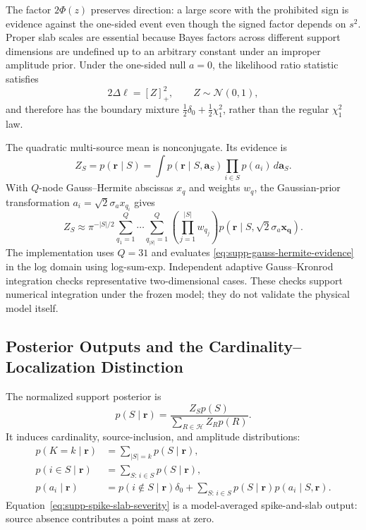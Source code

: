 The factor $2\Phi(z)$ preserves direction: a large score with the prohibited
sign is evidence against the one-sided event even though the signed factor
depends on $s^2$. Proper slab scales are essential because Bayes factors across
different support dimensions are undefined up to an arbitrary constant under
an improper amplitude prior. Under the one-sided null $a=0$, the likelihood
ratio statistic satisfies
\begin{equation}
 2\Delta\ell=[Z]_+^2,\qquad Z\sim\mathcal N(0,1),
 \label{eq:supp-boundary-lrt}
\end{equation}
and therefore has the boundary mixture
$\tfrac12\delta_0+\tfrac12\chi_1^2$, rather than the regular $\chi_1^2$ law.

The quadratic multi-source mean is nonconjugate. Its evidence is
\begin{equation}
 Z_S=p(\bm r\mid S)=
 \int p(\bm r\mid S,\bm a_S)
 \prod_{i\in S}p(a_i)\,d\bm a_S.
 \label{eq:supp-support-evidence}
\end{equation}
With $Q$-node Gauss--Hermite abscissas $x_q$ and weights $w_q$, the Gaussian-prior transformation $a_i=\sqrt2\sigma_ax_{q_i}$ gives
\begin{equation}
 Z_S\approx\pi^{-|S|/2}
 \sum_{q_1=1}^{Q}\cdots\sum_{q_{|S|}=1}^{Q}
 \left(\prod_{j=1}^{|S|}w_{q_j}\right)
 p(\bm r\mid S,\sqrt2\sigma_a\bm x_{\bm q}).
 \label{eq:supp-gauss-hermite-evidence}
\end{equation}
The implementation uses $Q=31$ and evaluates \eqref{eq:supp-gauss-hermite-evidence} in the log domain using log-sum-exp. Independent adaptive Gauss--Kronrod integration checks representative two-dimensional cases. These checks support numerical integration under the frozen model; they do not validate the physical model itself.

\subsection{Posterior Outputs and the Cardinality--Localization Distinction}

The normalized support posterior is
\begin{equation}
 p(S\mid\bm r)=
 \frac{Z_Sp(S)}{\sum_{R\in\mathcal H}Z_Rp(R)}.
 \label{eq:supp-support-posterior}
\end{equation}
It induces cardinality, source-inclusion, and amplitude distributions:
\begin{align}
 p(K=k\mid\bm r)&=\sum_{|S|=k}p(S\mid\bm r),\label{eq:supp-cardinality-posterior}\\
 p(i\in S\mid\bm r)&=\sum_{S:\,i\in S}p(S\mid\bm r),\label{eq:supp-inclusion-posterior}\\
 p(a_i\mid\bm r)&=p(i\notin S\mid\bm r)\delta_0
 +\sum_{S:\,i\in S}p(S\mid\bm r)p(a_i\mid S,\bm r).
 \label{eq:supp-spike-slab-severity}
\end{align}
Equation~\eqref{eq:supp-spike-slab-severity} is a model-averaged spike-and-slab output: source absence contributes a point mass at zero.

